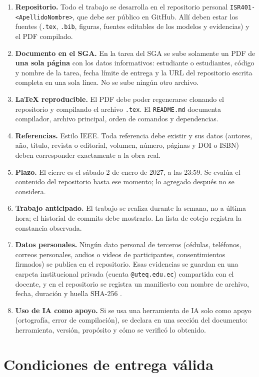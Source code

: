 \documentclass[11pt]{article}
\newcommand{\seccion}[1]{\section{\textcolor{utegreendk}{#1}}}
\begin{document}
\begin{enumerate}[leftmargin=20pt,itemsep=3pt]
	\item \textbf{Repositorio.} Todo el trabajo se desarrolla en el repositorio personal \texttt{ISR401-<ApellidoNombre>}, que debe ser público en GitHub. Allí deben estar los fuentes (\texttt{.tex}, \texttt{.bib}, figuras, fuentes editables de los modelos y evidencias) y el PDF compilado.
	\item \textbf{Documento en el SGA.} En la tarea del SGA se sube solamente un PDF de \textbf{una sola página} con los datos informativos: estudiante o estudiantes, código y nombre de la tarea, fecha límite de entrega y la URL del repositorio escrita completa en una sola línea. No se sube ningún otro archivo.
	\item \textbf{\LaTeX{} reproducible.} El PDF debe poder regenerarse clonando el repositorio y compilando el archivo \texttt{.tex}. El \texttt{README.md} documenta compilador, archivo principal, orden de comandos y dependencias.
	\item \textbf{Referencias.} Estilo IEEE. Toda referencia debe existir y sus datos (autores, año, título, revista o editorial, volumen, número, páginas y DOI o ISBN) deben corresponder exactamente a la obra real.
	\item \textbf{Plazo.} El cierre es el sábado 2 de enero de 2027, a las 23:59. Se evalúa el contenido del repositorio hasta ese momento; lo agregado después no se considera.
	\item \textbf{Trabajo anticipado.} El trabajo se realiza durante la semana, no a última hora; el historial de commits debe mostrarlo. La lista de cotejo registra la constancia observada.
	\item \textbf{Datos personales.} Ningún dato personal de terceros (cédulas, teléfonos, correos personales, audios o videos de participantes, consentimientos firmados) se publica en el repositorio. Esas evidencias se guardan en una carpeta institucional privada (cuenta \texttt{@uteq.edu.ec}) compartida con el docente, y en el repositorio se registra un manifiesto con nombre de archivo, fecha, duración y huella SHA-256 \citep{lopdp_2021}.
	\item \textbf{Uso de IA como apoyo.} Si se usa una herramienta de IA solo como apoyo (ortografía, error de compilación), se declara en una sección del documento: herramienta, versión, propósito y cómo se verificó lo obtenido.
\end{enumerate}

\seccion{Condiciones de entrega válida}
\end{document}
